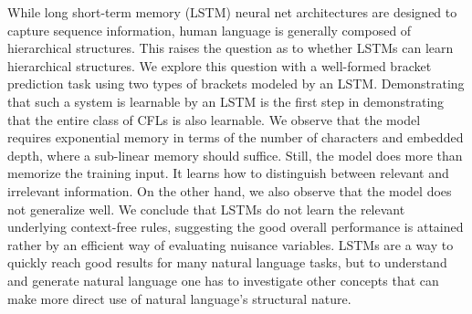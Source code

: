While long short-term memory (LSTM) neural net architectures are designed to capture sequence information, human language is generally composed of hierarchical structures. This raises the question as to whether LSTMs can learn hierarchical structures. We explore this question with a well-formed bracket prediction task using two types of brackets modeled by an LSTM. Demonstrating that such a system is learnable by an LSTM is the first step in demonstrating that the entire class of CFLs is also learnable. We observe that the model requires exponential memory in terms of the number of characters and embedded depth, where a sub-linear memory should suffice. Still, the model does more than memorize the training input. It learns how to distinguish between relevant and irrelevant information. On the other hand, we also observe that the model does not generalize well. We conclude that LSTMs do not learn the relevant underlying context-free rules, suggesting the good overall performance is attained rather by an efficient way of evaluating nuisance variables. LSTMs are a way to quickly reach good results for many natural language tasks, but to understand and generate natural language one has to investigate other concepts that can make more direct use of natural language's structural nature.
